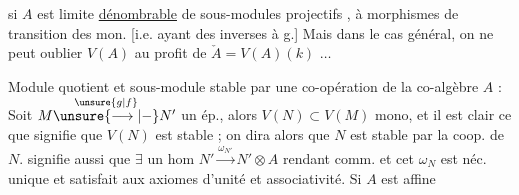   si $A$ est limite  \uline{dénombrable} de sous-modules projectifs , à morphismes de transition  des  mon.  [i.e. ayant des inverses à g.] Mais dans le cas général, on ne peut oublier $V(A)$  au profit de $\check A=V(A)(k)$ $\ldots$

Module quotient et sous-module stable par une co-opération de la co-algèbre $A$ : Soit $M\overset{\unsure{g|f}}{\unsure{\longrightarrow|-}}N'$ un ép., alors $V(N)\subset V(M)$ mono, et il est clair ce que signifie que $V(N)$ est stable ; on dira alors que $N$ est stable par la coop. de $N$.  signifie aussi que $\exists$ un hom $N'\overset{\omega_{N'}}{\longrightarrow}N'\otimes A$ rendant comm.
et cet $\omega_{N}$ est néc. unique et satisfait aux axiomes d'unité et associativité. Si $A$ est  affine
